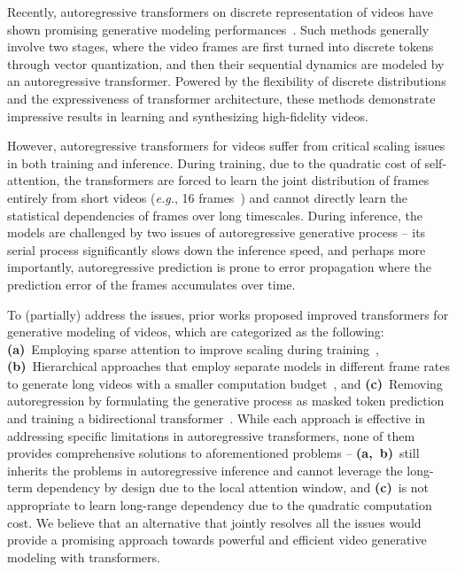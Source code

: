 \documentclass[10pt,twocolumn,letterpaper]{article}
\begin{document}
Recently, autoregressive transformers on discrete representation of videos have shown promising generative modeling performances~\cite{TATS, NUWA, videoGPT, LVT}.
Such methods generally involve two stages, where the video frames are first turned into discrete tokens through vector quantization, and then their sequential dynamics are modeled by an autoregressive transformer.
Powered by the flexibility of discrete distributions and the expressiveness of transformer architecture, these methods demonstrate impressive results in learning and synthesizing high-fidelity videos.



However, autoregressive transformers for videos suffer from critical scaling issues in both training and inference.
During training, due to the quadratic cost of self-attention, the transformers are forced to learn the joint distribution of frames entirely from short videos (\emph{e.g.}, 16 frames~\cite{TATS, videoGPT}) and cannot directly learn the statistical dependencies of frames over long timescales.
During inference, the models are challenged by two issues of autoregressive generative process -- its serial process significantly slows down the inference speed, and perhaps more importantly, autoregressive prediction is prone to error propagation where the prediction error of the frames accumulates over time.

To (partially) address the issues, prior works proposed improved transformers for generative modeling of videos, which are categorized as the following:
\textbf{(a)}~Employing sparse attention to improve scaling during training~\cite{NUWA, MaskViT, CogVideo},
\textbf{(b)}~Hierarchical approaches that employ separate models in different frame rates to generate long videos with a smaller computation budget~\cite{CogVideo, TATS}, and
\textbf{(c)}~Removing autoregression by formulating the generative process as masked token prediction and training a bidirectional transformer~\cite{MaskViT, MMVID}.
While each approach is effective in addressing specific limitations in autoregressive transformers, none of them provides comprehensive solutions to aforementioned problems -- \textbf{(a,~b)}~still inherits the problems in autoregressive inference and cannot leverage the long-term dependency by design due to the local attention window, and \textbf{(c)}~is not appropriate to learn long-range dependency due to the quadratic computation cost.
We believe that an alternative that jointly resolves all the issues would provide a promising approach towards powerful and efficient video generative modeling with transformers.
\end{document}
